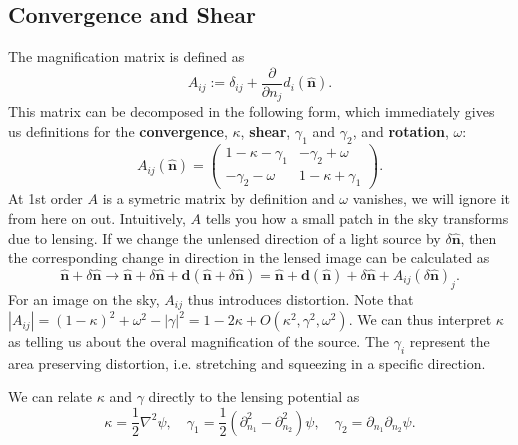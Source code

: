 \documentclass[11pt]{article} %
\begin{document}
\subsection{Convergence and Shear}
The magnification matrix is defined as
\begin{equation}
    A_{ij} := \delta_{ij} + \frac{\partial}{\partial n_j}d_i(\hat{\mathbf n}).
\end{equation}
This matrix can be decomposed in the following form, which immediately gives us definitions for the \textbf{convergence}, $\kappa$, \textbf{shear}, $\gamma_1$ and $\gamma_2$, and \textbf{rotation}, $\omega$:
\begin{equation}
    A_{ij}(\hat{\mathbf n}) = \begin{pmatrix}
        1 - \kappa - \gamma_1 & -\gamma_2 + \omega \\
        -\gamma_2 - \omega & 1 - \kappa + \gamma_1
    \end{pmatrix}.
\end{equation}
At 1st order $A$ is a symetric matrix by definition and $\omega$ vanishes, we will ignore it from here on out. Intuitively, $A$ tells you how a small patch in the sky transforms due to lensing. If we change the unlensed direction of a light source by $\delta\hat{\mathbf n}$, then the corresponding change in direction in the lensed image can be calculated as
\begin{equation}
\hat{\mathbf{n}} + \delta \hat{\mathbf{n}} \rightarrow \hat{\mathbf{n}} + \delta \hat{\mathbf{n}} + \mathbf d (\hat{\mathbf{n}} + \delta \hat{\mathbf{n}}) = \hat{\mathbf{n}} + \mathbf d (\hat{\mathbf n}) + \delta \hat{\mathbf n} + A_{ij}(\delta \hat{\mathbf{n}})_j.
\end{equation}
For an image on the sky, $A_{ij}$ thus introduces distortion. Note that $|A_{ij}| = (1 - \kappa)^2 + \omega^2 - |\gamma|^2 = 1 - 2\kappa + O(\kappa^2, \gamma^2, \omega^2)$. We can thus interpret $\kappa$ as telling us about the overal magnification of the source. The $\gamma_i$ represent the area preserving distortion, i.e. stretching and squeezing in a specific direction.

We can relate $\kappa$ and $\gamma$ directly to the lensing potential as
\begin{equation}
    \kappa = \frac{1}{2}\nabla^2\psi, \quad \gamma_1 = \frac{1}{2}(\partial_{n_1}^2 - \partial_{n_2}^2)\psi, \quad \gamma_2 = \partial_{n_1}\partial_{n_2} \psi.
\end{equation}
\end{document}
